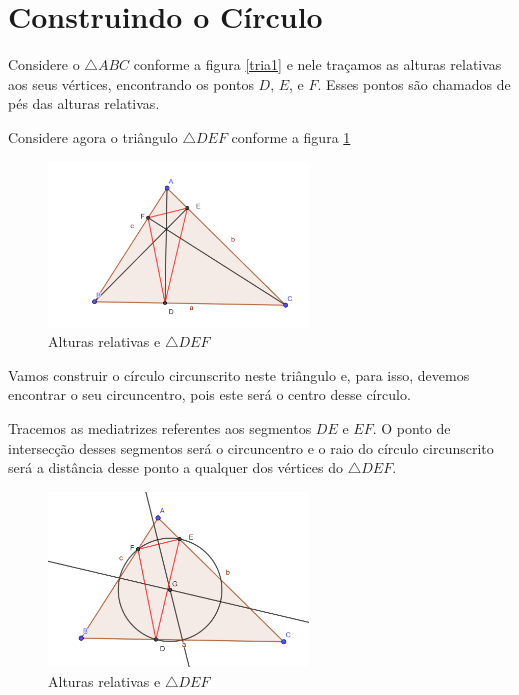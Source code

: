 \documentclass[12pt, openright, a4paper, brazil, openany, oneside]{abntex2}
\begin{document}
\section{Construindo o Círculo}

Considere o $\triangle ABC$ conforme a figura \ref{tria1} e nele traçamos as alturas relativas aos seus vértices, encontrando os pontos $D$, $E$, e $F$. Esses pontos são chamados de pés das alturas relativas.

\newpage

Considere agora o triângulo $\triangle DEF$ conforme a figura \ref{tria2} 

\begin{figure}[h]

    \center

    \includegraphics[width=6.9cm]{triangulo2.png}
    \caption{Alturas relativas e $\triangle DEF$ \label{tria2}}
    
\end{figure}

Vamos construir o círculo circunscrito neste triângulo e, para isso, devemos encontrar o seu circuncentro, pois este será o centro desse círculo.

Tracemos as mediatrizes referentes aos segmentos $DE$ e $EF$. O ponto de intersecção desses segmentos será o circuncentro e o raio do círculo circunscrito será a distância desse ponto a qualquer dos vértices do $\triangle DEF$.

\begin{figure}[h]

    \center

    \includegraphics[width=6.9cm]{triangulo3.png}
    \caption{Alturas relativas e $\triangle DEF$ \label{tria3}}
    
\end{figure}
\end{document}

